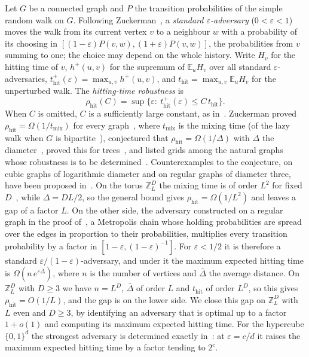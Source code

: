 \documentclass[11pt]{amsart}
\theoremstyle{remark}
\newcommand{\eps}{\varepsilon}
\newcommand{\E}{\mathbb{E}}
\newcommand{\Z}{\mathbb{Z}}
\newcommand{\thit}{t_{\mathrm{hit}}}
\newcommand{\rhit}{\rho_{\mathrm{hit}}}
\begin{document}
Let $G$ be a connected graph and $P$ the transition probabilities of the simple random walk on $G$. Following
Zuckerman~\cite{Zuc26}, a \emph{standard $\eps$-adversary} ($0<\eps<1$) moves the walk from its current vertex $v$ to a
neighbour $w$ with a probability of its choosing in $[(1-\eps)P(v,w),(1+\eps)P(v,w)]$, the probabilities from $v$
summing to one; the choice may depend on the whole history. Write $H_v$ for the hitting time of $v$, $h^+(u,v)$ for
the supremum of $\E_u H_v$ over all standard $\eps$-adversaries, $\thit^+(\eps)=\max_{u,v}h^+(u,v)$, and
$\thit=\max_{u,v}\E_uH_v$ for the unperturbed walk. The \emph{hitting-time robustness} is
\[
\rhit(C)=\sup\{\eps:\ \thit^+(\eps)\le C\,\thit\}.
\]
When $C$ is omitted, $C$ is a sufficiently large constant, as in~\cite[Definition~1.9]{Zuc26}.
Zuckerman proved $\rhit=\Omega(1/t_{\mathrm{mix}})$ for every graph~\cite[Theorem~1.10]{Zuc26}, where
$t_{\mathrm{mix}}$ is the mixing time (of the lazy walk when $G$ is bipartite~\cite[Remark~2.9]{Zuc26}), conjectured
that $\rhit=\Omega(1/\Delta)$ with $\Delta$ the diameter~\cite[Conjecture~1.16]{Zuc26}, proved this for trees~\cite[Theorem~1.11]{Zuc26}, and listed
grids among the natural graphs whose robustness is to be determined~\cite[Section~1.10]{Zuc26}. Counterexamples to the conjecture, on cubic graphs of logarithmic diameter and on regular graphs of diameter three, have been proposed in~\cite{Anon26}. On the torus
$\Z_L^D$ the mixing time is of order $L^2$ for fixed $D$~\cite{LPW17}, while $\Delta=DL/2$, so the general bound gives
$\rhit=\Omega(1/L^2)$ and leaves a gap of a factor $L$. On the other side, the adversary constructed on a regular graph in the proof
of~\cite[Theorem~4.5]{Zuc26}, a Metropolis chain whose holding probabilities are spread over the edges in proportion to
their probabilities, multiplies every transition probability by a factor in $[1-\eps,(1-\eps)^{-1}]$. For $\eps<1/2$
it is therefore a standard $\eps/(1-\eps)$-adversary, and under it the maximum expected hitting time is
$\Omega(n\,e^{\eps\bar\Delta})$, where $n$ is the number of vertices and $\bar\Delta$ the average distance. On
$\Z_L^D$ with $D\ge3$ we have $n=L^D$, $\bar\Delta$ of order $L$ and $\thit$ of order $L^D$, so this gives
$\rhit=O(1/L)$, and the gap is on the lower side. We close
this gap on $\Z_L^D$ with $L$ even and $D\ge3$, by identifying an adversary that is optimal up to a factor $1+o(1)$ and computing its
maximum expected hitting time. For the hypercube $\{0,1\}^d$ the strongest adversary is determined exactly in~\cite{ShmCube}: at $\eps=c/d$ it raises
the maximum expected hitting time by a factor tending to $2^c$.
\end{document}
